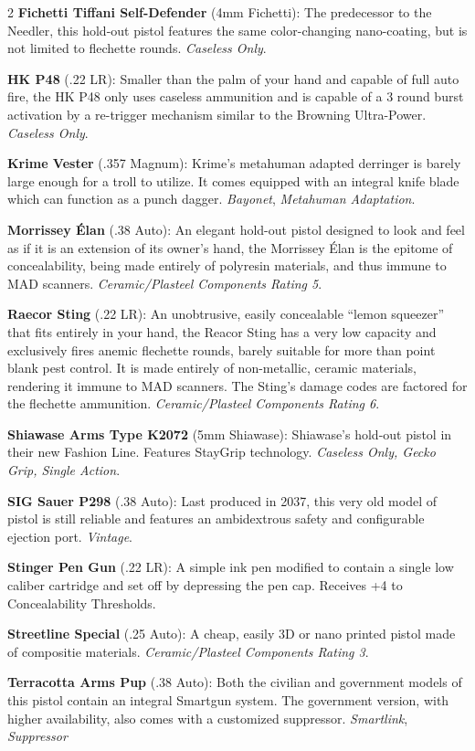 \documentclass[
  oneside]{article}
\begin{document}
\begin{multicols}{2}
\textbf{Fichetti Tiffani Self-Defender} (4mm
Fichetti): The predecessor to the Needler, this
hold-out pistol features the same color-changing
nano-coating, but is not limited to flechette
rounds. \emph{Caseless Only}.

\textbf{HK P48} (.22 LR): Smaller than the palm of
your hand and capable of full auto fire, the HK
P48 only uses caseless ammunition and is capable
of a 3 round burst activation by a re-trigger
mechanism similar to the Browning Ultra-Power.
\emph{Caseless Only}.

\textbf{Krime Vester} (.357 Magnum): Krime's
metahuman adapted derringer is barely large enough
for a troll to utilize. It comes equipped with an
integral knife blade which can function as a punch
dagger. \emph{Bayonet}, \emph{Metahuman
Adaptation}.

\textbf{Morrissey Élan} (.38 Auto): An elegant
hold-out pistol designed to look and feel as if it
is an extension of its owner's hand, the Morrissey
Élan is the epitome of concealability, being made
entirely of polyresin materials, and thus immune
to MAD scanners. \emph{Ceramic/Plasteel Components
Rating 5}.

\textbf{Raecor Sting} (.22 LR): An unobtrusive,
easily concealable ``lemon squeezer'' that fits
entirely in your hand, the Reacor Sting has a very
low capacity and exclusively fires anemic
flechette rounds, barely suitable for more than
point blank pest control. It is made entirely of
non-metallic, ceramic materials, rendering it
immune to MAD scanners. The Sting's damage codes
are factored for the flechette ammunition.
\emph{Ceramic/Plasteel Components Rating 6}.

\textbf{Shiawase Arms Type K2072} (5mm Shiawase):
Shiawase's hold-out pistol in their new Fashion
Line. Features StayGrip technology. \emph{Caseless
Only, Gecko Grip, Single Action}.

\textbf{SIG Sauer P298} (.38 Auto): Last produced
in 2037, this very old model of pistol is still
reliable and features an ambidextrous safety and
configurable ejection port. \emph{Vintage}.

\textbf{Stinger Pen Gun} (.22 LR): A simple ink
pen modified to contain a single low caliber
cartridge and set off by depressing the pen cap.
Receives +4 to Concealability Thresholds.

\textbf{Streetline Special} (.25 Auto): A cheap,
easily 3D or nano printed pistol made of
compositie materials. \emph{Ceramic/Plasteel
Components Rating 3}.

\textbf{Terracotta Arms Pup} (.38 Auto): Both the
civilian and government models of this pistol
contain an integral Smartgun system. The
government version, with higher availability, also
comes with a customized suppressor.
\emph{Smartlink}, \emph{Suppressor}


\end{multicols}
\end{document}
